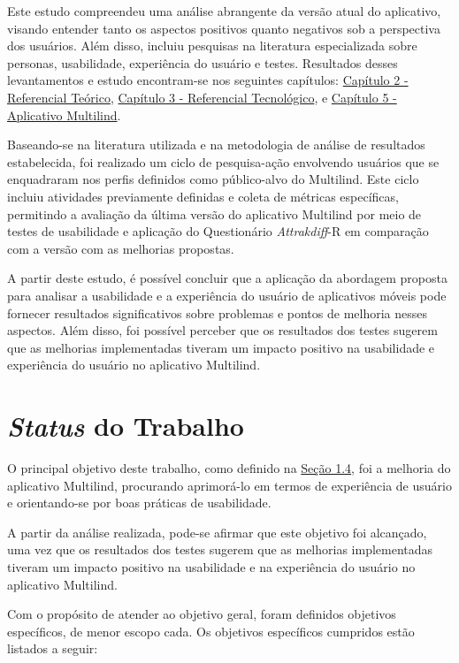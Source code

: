 Este estudo compreendeu uma análise abrangente da versão atual do aplicativo, visando entender tanto os aspectos positivos quanto negativos sob a perspectiva dos usuários. 
Além disso, incluiu pesquisas na literatura especializada sobre personas, usabilidade, experiência do usuário e testes.  Resultados desses levantamentos e estudo encontram-se 
nos seguintes capítulos: \hyperref[chap:Referencial]{Capítulo 2 - Referencial Teórico}, \hyperref[chap:ReferencialTech]{Capítulo 3 - Referencial Tecnológico}, e 
\hyperref[chap:Aplicativo Multilind]{Capítulo 5 - Aplicativo Multilind}.

Baseando-se na literatura utilizada e na metodologia de análise de resultados estabelecida, foi realizado um ciclo de pesquisa-ação envolvendo usuários que se enquadraram nos 
perfis definidos como público-alvo do Multilind. Este ciclo incluiu atividades previamente definidas e coleta de métricas específicas, permitindo a avaliação da última versão 
do aplicativo Multilind por meio de testes de usabilidade e aplicação do Questionário \textit{Attrakdiff}-R em comparação com a versão com as melhorias propostas.

A partir deste estudo, é possível concluir que a aplicação da abordagem proposta para analisar a usabilidade e a experiência do usuário de aplicativos móveis pode fornecer 
resultados significativos sobre problemas e pontos de melhoria nesses aspectos. Além disso, foi possível perceber que os resultados dos testes sugerem que as melhorias 
implementadas tiveram um impacto positivo na usabilidade e experiência do usuário no aplicativo Multilind.

\section{\textit{Status} do Trabalho}
\label{sec:Status do Trabalho}
O principal objetivo deste trabalho, como definido na \hyperref[sec:Objetivos]{Seção 1.4}, foi a melhoria do aplicativo Multilind, procurando aprimorá-lo em termos 
de experiência de usuário e orientando-se por boas práticas de usabilidade.

A partir da análise realizada, pode-se afirmar que este objetivo foi alcançado, uma vez que os resultados dos testes sugerem que as melhorias implementadas tiveram um impacto 
positivo na usabilidade e na experiência do usuário no aplicativo Multilind.

Com o propósito de atender ao objetivo geral, foram definidos objetivos específicos, de menor escopo cada. Os objetivos específicos cumpridos estão listados a
seguir:

